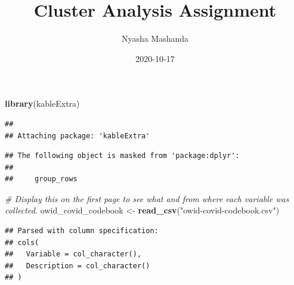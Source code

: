 \documentclass[
]{article}
\title{\vspace{3.5in} Cluster Analysis Assignment}
\author{Nyasha Mashanda}
\date{2020-10-17}
\newenvironment{Shaded}{\begin{snugshade}}{\end{snugshade}}
\newcommand{\CommentTok}[1]{\textcolor[rgb]{0.56,0.35,0.01}{\textit{#1}}}
\newcommand{\DataTypeTok}[1]{\textcolor[rgb]{0.13,0.29,0.53}{#1}}
\newcommand{\DecValTok}[1]{\textcolor[rgb]{0.00,0.00,0.81}{#1}}
\newcommand{\KeywordTok}[1]{\textcolor[rgb]{0.13,0.29,0.53}{\textbf{#1}}}
\newcommand{\NormalTok}[1]{#1}
\newcommand{\OperatorTok}[1]{\textcolor[rgb]{0.81,0.36,0.00}{\textbf{#1}}}
\newcommand{\StringTok}[1]{\textcolor[rgb]{0.31,0.60,0.02}{#1}}
\begin{document}
\maketitle

{
\setcounter{tocdepth}{2}
\tableofcontents
}
\newpage 
\tableofcontents 
\listoffigures
\listoftables
\newpage

\begin{Shaded}
\begin{Highlighting}[]
\KeywordTok{library}\NormalTok{(kableExtra)}
\end{Highlighting}
\end{Shaded}

\begin{verbatim}
## 
## Attaching package: 'kableExtra'
\end{verbatim}

\begin{verbatim}
## The following object is masked from 'package:dplyr':
## 
##     group_rows
\end{verbatim}

\begin{Shaded}
\begin{Highlighting}[]
\CommentTok{# Display this on the first page to see what and from where each variable was collected.}
\NormalTok{owid_covid_codebook <-}\StringTok{ }\KeywordTok{read_csv}\NormalTok{(}\StringTok{"owid-covid-codebook.csv"}\NormalTok{)}
\end{Highlighting}
\end{Shaded}

\begin{verbatim}
## Parsed with column specification:
## cols(
##   Variable = col_character(),
##   Description = col_character()
## )
\end{verbatim}

\begin{Shaded}
\end{Shaded}
\end{document}
